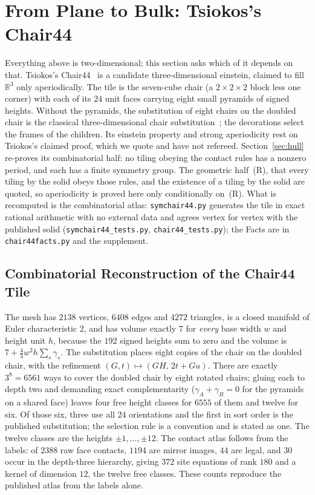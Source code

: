 \documentclass[11pt]{article}
\theoremstyle{definition}
\theoremstyle{remark}
\newcommand{\code}[1]{\texttt{#1}}
\begin{document}
\section{From Plane to Bulk: Tsiokos's Chair44}
\label{sec:chair}

Everything above is two-dimensional; this section asks which of it depends on that.  Tsiokos's
Chair44~\cite{Tsiokos1} is a candidate three-dimensional einstein, claimed to fill $\mathbb{R}^{3}$ only aperiodically.  The
tile is the seven-cube chair (a $2\times2\times2$ block less one corner) with each of its $24$ unit faces carrying eight
small pyramids of signed heights.  Without the pyramids, the substitution of eight chairs on the doubled chair is the
classical three-dimensional chair substitution~\cite{Robinson,LeeMoody}; the decorations select the frames of the
children.  Its einstein property and strong aperiodicity rest on Tsiokos's claimed proof, which we quote and have
not refereed.  Section~\ref{sec:hull} re-proves its combinatorial half: no tiling obeying the contact rules has a
nonzero period, and each has a finite symmetry group.  The geometric half~(R), that every tiling by the solid obeys
those rules, and the existence of a tiling by the solid are quoted, so aperiodicity is proved here only conditionally
on~(R).  What is recomputed is the combinatorial atlas: \code{symchair44.py} generates
the tile in exact rational arithmetic with no external data and agrees vertex for vertex with the published solid
(\code{symchair44\_tests.py}, \code{chair44\_tests.py}); the Facts are in \code{chair44facts.py} and the supplement.

\subsection{Combinatorial Reconstruction of the Chair44 Tile}

The mesh has $2138$ vertices, $6408$ edges and $4272$ triangles, is a closed
manifold of Euler characteristic $2$, and has volume exactly $7$ for \emph{every} base
width $w$ and height unit $h$, because the $192$ signed heights sum to zero and the volume is
$7+\tfrac43 w^{2}h\sum_{s}\gamma_{s}$.  The substitution places eight copies of the chair
on the doubled chair, with the refinement $(G,t)\mapsto(GH,\,2t+Gu)$.  There are exactly
$3^{8}=6561$ ways to cover the doubled chair by eight rotated chairs; gluing each to
depth two and demanding exact complementarity ($\gamma_A+\gamma_B=0$ for the pyramids on a
shared face) leaves four free height classes for $6555$ of them and twelve for six.  Of those six,
three use all $24$ orientations and the first in sort order is the published substitution; the
selection rule is a convention and is stated as one.  The twelve classes are the heights
$\pm1,\dots,\pm12$.  The contact atlas follows from the labels: of $2388$ raw face contacts,
$1194$ are mirror images, $44$ are legal, and $30$ occur in the depth-three
hierarchy, giving $372$ site equations of rank $180$ and a kernel of dimension $12$,
the twelve free classes.  These counts reproduce the published atlas from the labels
alone.
\end{document}
